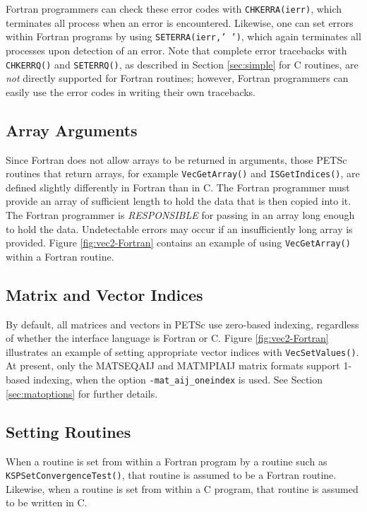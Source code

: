 Fortran programmers can check these error codes with {\tt CHKERRA(ierr)},
which terminates all process when an error is encountered.  Likewise,
one can set errors within Fortran programs by using {\tt SETERRA(ierr,' ')},
which again terminates all processes upon detection of an error.  Note
that complete error tracebacks with {\tt CHKERRQ()} and {\tt SETERRQ()},
as described in Section \ref{sec:simple} for C routines,
are {\em not} directly supported for Fortran routines; however, Fortran programmers
can easily use the error codes in writing their own tracebacks.

\subsection{Array Arguments}

Since Fortran does not allow arrays to be returned in arguments, those
PETSc routines that return arrays, for example {\tt VecGetArray()} and
{\tt ISGetIndices()}, are defined slightly differently in Fortran than
in C. The Fortran programmer must provide an array of sufficient
length to hold the data that is then copied into it. The Fortran
programmer is {\em RESPONSIBLE} for passing in an array long enough to
hold the data.  Undetectable errors may occur if an insufficiently
long array is provided.  
Figure \ref{fig:vec2-Fortran} contains an example of using {\tt VecGetArray()}
within a Fortran routine.

\subsection{Matrix and Vector Indices}

By default, all matrices and vectors in PETSc use zero-based indexing,
regardless of whether the interface language is Fortran or C.  Figure
\ref{fig:vec2-Fortran} illustrates an example of setting appropriate
vector indices with {\tt VecSetValues()}.  At present, only the
MATSEQAIJ and MATMPIAIJ matrix formats support 1-based indexing,
when the option {\tt -mat\_aij\_oneindex} 
is used.  See Section \ref{sec:matoptions} for further details.

\subsection{Setting Routines}

When a routine is set from within a Fortran program by a routine such as
{\tt KSPSetConvergenceTest()}, that routine is
assumed to be a Fortran routine. Likewise, when a routine is set
from within a C program, that routine is assumed to be written in C.

